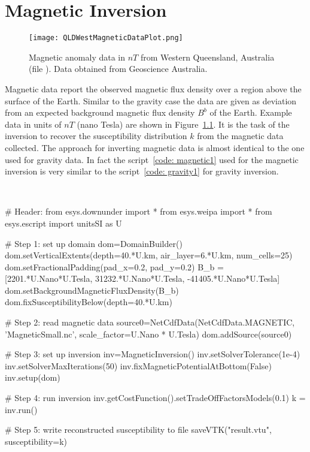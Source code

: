 \chapter{Magnetic Inversion}\label{Chp:cook:magnetic inversion}

\begin{figure}
\centering
\texttt{[image: QLDWestMagneticDataPlot.png]}
\caption{Magnetic anomaly data in $nT$ from Western Queensland, Australia
    (file ). Data obtained from Geoscience Australia.}
\label{FIG:P1:MAG:0}
\end{figure}

Magnetic data report the observed magnetic flux density over a region above the
surface of the Earth.
Similar to the gravity case the data are given as deviation from an expected
background magnetic flux density $B^b$ of the Earth.
Example data in units of $nT$ (nano Tesla) are shown in Figure~\ref{FIG:P1:MAG:0}.
It is the task of the inversion to recover the susceptibility distribution $k$
from the magnetic data collected. The approach for inverting magnetic data is
almost identical to the one used for gravity data. 
In fact the \downunder script~\ref{code: magnetic1} used for the magnetic
inversion is very similar to the script~\ref{code: gravity1} for gravity inversion.

\begin{pyc}\label{code: magnetic1}
\
\begin{python}
# Header:
from esys.downunder import *
from esys.weipa import *
from esys.escript import unitsSI as U


# Step 1: set up domain
dom=DomainBuilder()
dom.setVerticalExtents(depth=40.*U.km, air_layer=6.*U.km, num_cells=25)
dom.setFractionalPadding(pad_x=0.2, pad_y=0.2)
B_b = [2201.*U.Nano*U.Tesla,  31232.*U.Nano*U.Tesla, -41405.*U.Nano*U.Tesla]
dom.setBackgroundMagneticFluxDensity(B_b)
dom.fixSusceptibilityBelow(depth=40.*U.km)

# Step 2: read magnetic data
source0=NetCdfData(NetCdfData.MAGNETIC, 'MagneticSmall.nc', scale_factor=U.Nano * U.Tesla)
dom.addSource(source0)

# Step 3: set up inversion
inv=MagneticInversion()
inv.setSolverTolerance(1e-4)
inv.setSolverMaxIterations(50)
inv.fixMagneticPotentialAtBottom(False)
inv.setup(dom)

# Step 4: run inversion 
inv.getCostFunction().setTradeOffFactorsModels(0.1) 
k = inv.run()

# Step 5: write reconstructed susceptibility to file
saveVTK("result.vtu", susceptibility=k)
\end{python}
\end{pyc}


